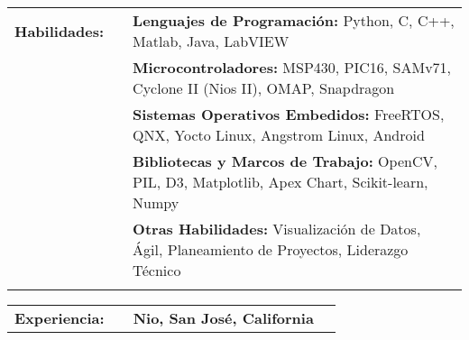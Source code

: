 \documentclass{minimal}
\begin{document}

\begin{center}
\fontsize{14}{12.8}\selectfont
\name\\
\fontsize{10}{12}\selectfont
\address\\
\phone\\
\email\\
\github\\
\end{center}
\vspace{0.5cm}

\begin{tabular}{ p{1.5cm} p{1cm} p{16cm} }
\textbf{Habilidades:} & & \textbf{Lenguajes de Programación:} Python, C, C++, Matlab, Java, LabVIEW\\
& & \textbf{Microcontroladores:} MSP430, PIC16, SAMv71, Cyclone II (Nios II), OMAP, Snapdragon\\
& & \textbf{Sistemas Operativos Embedidos:} FreeRTOS, QNX, Yocto Linux, Angstrom Linux, Android\\
& & \textbf{Bibliotecas y Marcos de Trabajo:} OpenCV, PIL, D3, Matplotlib, Apex Chart, Scikit-learn, Numpy\\
& & \textbf{Otras Habilidades:} Visualización de Datos, Ágil, Planeamiento de Proyectos, Liderazgo Técnico\\
& & \\
\end{tabular}

\begin{tabular}{ p{1.5cm} p{1cm} p{16cm} >{\raggedleft\arraybackslash}p{3cm} }
\textbf{Experiencia:} & & \textbf{Nio, San José, California} & \\
\end{tabular}
\end{document}
